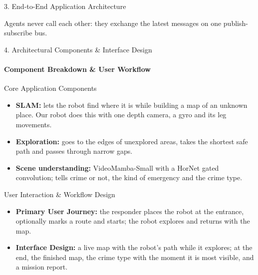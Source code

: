 \documentclass[aspectratio=169, 11pt]{beamer}
\begin{document}
\begin{frame}{3. End-to-End Application Architecture}
{}

\vspace{0.07cm}
{\scriptsize Agents never call each other: they exchange the latest messages on one publish-subscribe bus.}
\end{frame}

\begin{frame}{4. Architectural Components \& Interface Design}
    \framesubtitle{Component Breakdown \& User Workflow}
    \begin{block}{Core Application Components}
        \small
        \begin{itemize}
            \item \textbf{SLAM:} lets the robot find where it is while building a map of an unknown place. Our robot does this with one depth camera, a gyro and its leg movements.
            \item \textbf{Exploration:} goes to the edges of unexplored areas, takes the shortest safe path and passes through narrow gaps.
            \item \textbf{Scene understanding:} VideoMamba-Small with a HorNet gated convolution; tells crime or not, the kind of emergency and the crime type.
        \end{itemize}
    \end{block}

    \begin{block}{User Interaction \& Workflow Design}
        \small
        \begin{itemize}
            \item \textbf{Primary User Journey:} the responder places the robot at the entrance, optionally marks a route and starts; the robot explores and returns with the map.
            \item \textbf{Interface Design:} a live map with the robot's path while it explores; at the end, the finished map, the crime type with the moment it is most visible, and a mission report.
        \end{itemize}
    \end{block}
\end{frame}
\end{document}

